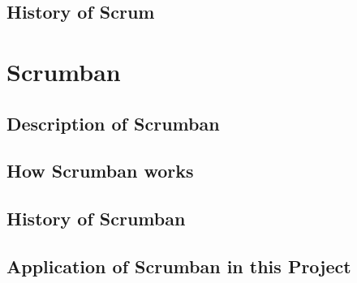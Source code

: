 \subsection{History of Scrum}

\section{Scrumban}

\subsection{Description of Scrumban}

\subsection{How Scrumban works}

\subsection{History of Scrumban}

\subsection{Application of Scrumban in this Project}